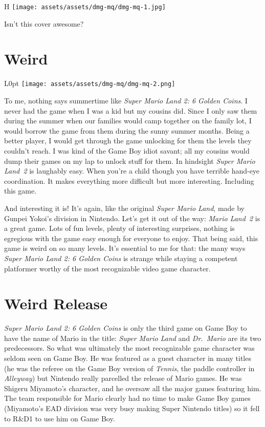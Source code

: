 \documentclass{book}
\begin{document}
\begin{wrapfigure}{H}{\linewidth}
\vskip 4pt
\centering \texttt{[image: assets/assets/dmg-mq/dmg-mq-1.jpg]}\par\pagetwodescription Isn’t this cover awesome?\end{wrapfigure}
\clearpage

\FloatBarrier\needspace{10mm}\section*{Weird}\nopagebreak[4]

\begin{wrapfigure}{L}{0pt} \texttt{[image: assets/assets/dmg-mq/dmg-mq-2.png]}\end{wrapfigure}
To me, nothing says summertime like \emph{Super Mario Land 2: 6 Golden Coins}. I never had the game when I was a kid but my cousins did. Since I only saw them during the summer when our families would camp together on the family lot, I would borrow the game from them during the sunny summer months. Being a better player, I would get through the game unlocking for them the levels they couldn’t reach. I was kind of the Game Boy idiot savant; all my cousins would dump their games on my lap to unlock stuff for them. In hindsight \emph{Super Mario Land 2} is laughably easy. When you’re a child though you have terrible hand-eye coordination. It makes everything more difficult but more interesting. Including this game.

And interesting it is! It’s again, like the original \emph{Super Mario Land}, made by Gunpei Yokoi’s division in Nintendo. Let’s get it out of the way: \emph{Mario Land 2} is a great game. Lots of fun levels, plenty of interesting surprises, nothing is egregious with the game easy enough for everyone to enjoy. That being said, this game is weird on so many levels. It’s essential to me for that: the many ways \emph{Super Mario Land 2: 6 Golden Coins} is strange while staying a competent platformer worthy of the most recognizable video game character.

\FloatBarrier\needspace{10mm}\section*{Weird Release}\nopagebreak[4]

\emph{Super Mario Land 2: 6 Golden Coins} is only the third game on Game Boy to have the name of Mario in the title: \emph{Super Mario Land} and \emph{Dr. Mario} are its two predecessors. So what was ultimately the most recognizable game character was seldom seen on Game Boy. He was featured as a guest character in many titles (he was the referee on the Game Boy version of \emph{Tennis}, the paddle controller in \emph{Alleyway}) but Nintendo really parcelled the release of Mario games. He was Shigeru Miyamoto’s character, and he oversaw all the major games featuring him. The team responsible for Mario clearly had no time to make Game Boy games (Miyamoto’s EAD division was very busy making Super Nintendo titles) so it fell to R\&D1 to use him on Game Boy.
\end{document}
